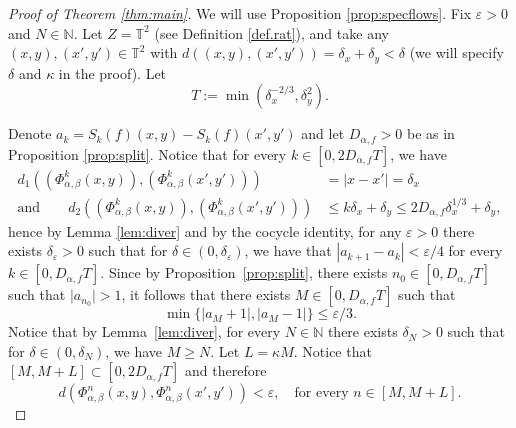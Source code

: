 \documentclass[10pt]{amsart}
\let\epsilon\varepsilon
\theoremstyle{definition}
\theoremstyle{plain}
\newcommand\NN{\mathbb{N}}
\newcommand\TT{\mathbb{T}}
\begin{document}
\begin{proof}[Proof of Theorem \ref{thm:main}]
We will use Proposition \ref{prop:specflows}.
Fix $\epsilon>0$ and $N\in \NN$. Let $Z=\TT^2$ (see Definition \ref{def.rat}), and take any $(x,y),(x',y')\!\in\!\TT^2$ with
\hbox{$d((x,y),(x',y'))\!=\!\delta_x+\delta_y\!<\!\delta$} (we will specify $\delta$ and $\kappa$ in the proof). Let
\begin{equation}\label{def:time}
T:=\min(\delta_x^{-2/3},\delta_y^2).
\end{equation}

Denote $a_k=S_k(f)(x,y) - S_k(f)(x',y')$ and let $D_{\alpha,f}>0$ be as in Proposition \ref{prop:split}. Notice that
for every $k\in [0,2D_{\alpha,f}T]$, we have
\begin{equation}\label{eq:distn}
\begin{split}
d_1((\Phi_{\alpha,\beta}^k(x,y)),(\Phi_{\alpha,\beta}^k(x',y')))&=\vert x-x'\vert=
\delta_x\\
\text{and}\qquad
d_2((\Phi_{\alpha,\beta}^k(x,y)),(\Phi_{\alpha,\beta}^k(x',y')))&\leq k\delta_x+\delta_y\leq 2D_{\alpha,f}\delta_x^{1/3}+\delta_y,
\end{split}
\end{equation}
hence by Lemma \ref{lem:diver} and by the cocycle identity, for any $\epsilon>0$ there exists $\delta_\epsilon>0$ such
that for $\delta\in (0, \delta_\epsilon)$, we have that $|a_{k+1} -a_k| < \epsilon/4$ for every $k \in [0,D_{\alpha,f} T]$.
Since by Proposition~\ref{prop:split}, there exists
$n_0 \in [0,D_{\alpha,f}T]$ such that $\vert a_{n_0} \vert >1$, it follows that there exists $M\in [0,D_{\alpha,f}T]$ such that
\[
\min \{ |a_M + 1|, | a_M - 1|\} \leq \epsilon/3.
\]
Notice that by Lemma~\ref{lem:diver}, for every $N\in \NN$ there exists $\delta_N>0$ such that for $\delta\in (0,\delta_N)$, we have $M\geq N$.
Let $L=\kappa M$. Notice that $[M,M+L]\subset [0,2D_{\alpha,f}T]$ and therefore
\begin{equation}\label{eq:eps}
d(\Phi_{\alpha,\beta}^n(x,y),\Phi_{\alpha,\beta}^n(x',y'))<\epsilon, \quad\text{for every } n\in [M,M+L].
\end{equation}


\end{proof}
\end{document}
